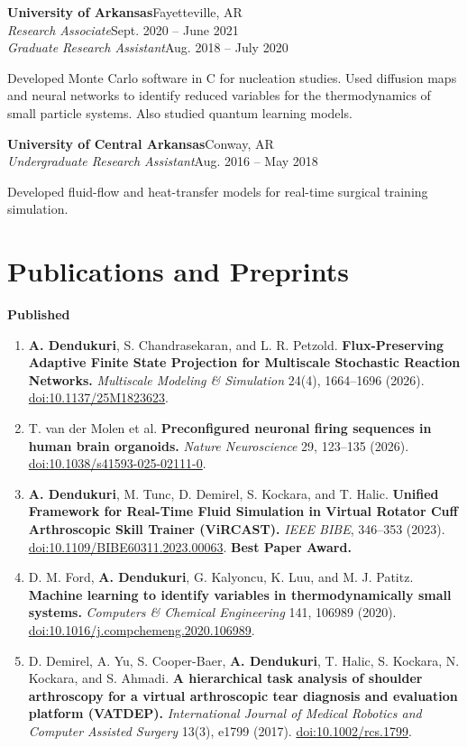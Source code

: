 \documentclass[11pt,letterpaper]{article}
\newcommand{\entry}[4]{\Needspace{4\baselineskip}\textbf{#1}\hfill #2\\\textit{#3}\hfill #4\par}
\newcommand{\me}{\textbf{A. Dendukuri}}
\begin{document}
\textbf{University of Arkansas}\hfill Fayetteville, AR\\
\textit{Research Associate}\hfill Sept. 2020 -- June 2021\\
\textit{Graduate Research Assistant}\hfill Aug. 2018 -- July 2020\par
Developed Monte Carlo software in C for nucleation studies. Used diffusion maps and neural networks
to identify reduced variables for the thermodynamics of small particle systems. Also studied quantum learning models.

\entry{University of Central Arkansas}{Conway, AR}
{Undergraduate Research Assistant}{Aug. 2016 -- May 2018}
Developed fluid-flow and heat-transfer models for real-time surgical training simulation.

\section*{Publications and Preprints}
\textbf{Published}
\begin{enumerate}
\item \me, S. Chandrasekaran, and L. R. Petzold.
\textbf{Flux-Preserving Adaptive Finite State Projection for Multiscale Stochastic Reaction Networks.}
\textit{Multiscale Modeling \& Simulation} 24(4), 1664--1696 (2026).
\href{https://doi.org/10.1137/25M1823623}{doi:10.1137/25M1823623}.
\item T. van der Molen et al.
\textbf{Preconfigured neuronal firing sequences in human brain organoids.}
\textit{Nature Neuroscience} 29, 123--135 (2026).
\href{https://doi.org/10.1038/s41593-025-02111-0}{doi:10.1038/s41593-025-02111-0}.
\item \me, M. Tunc, D. Demirel, S. Kockara, and T. Halic.
\textbf{Unified Framework for Real-Time Fluid Simulation in Virtual Rotator Cuff Arthroscopic Skill Trainer (ViRCAST).}
\textit{IEEE BIBE}, 346--353 (2023).
\href{https://doi.org/10.1109/BIBE60311.2023.00063}{doi:10.1109/BIBE60311.2023.00063}.
\textbf{Best Paper Award.}
\item D. M. Ford, \me, G. Kalyoncu, K. Luu, and M. J. Patitz.
\textbf{Machine learning to identify variables in thermodynamically small systems.}
\textit{Computers \& Chemical Engineering} 141, 106989 (2020).
\href{https://doi.org/10.1016/j.compchemeng.2020.106989}{doi:10.1016/j.compchemeng.2020.106989}.
\item D. Demirel, A. Yu, S. Cooper-Baer, \me, T. Halic, S. Kockara, N. Kockara, and S. Ahmadi.
\textbf{A hierarchical task analysis of shoulder arthroscopy for a virtual arthroscopic tear diagnosis and evaluation platform (VATDEP).}
\textit{International Journal of Medical Robotics and Computer Assisted Surgery} 13(3), e1799 (2017).
\href{https://doi.org/10.1002/rcs.1799}{doi:10.1002/rcs.1799}.
\end{enumerate}
\end{document}
